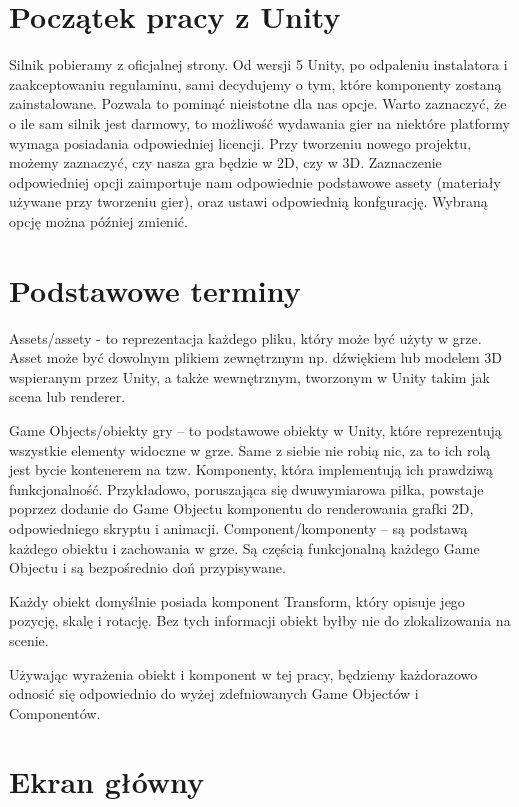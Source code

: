 \documentclass[openright]{xmgr}
\begin{document}
\section{Początek pracy z Unity}

Silnik pobieramy z oficjalnej strony. Od wersji 5 Unity, po odpaleniu instalatora i zaakceptowaniu regulaminu, sami decydujemy o tym, które komponenty zostaną zainstalowane. Pozwala to pominąć nieistotne dla nas opcje. Warto zaznaczyć, że o ile sam silnik jest darmowy, to możliwość wydawania gier na niektóre platformy wymaga posiadania odpowiedniej licencji. Przy tworzeniu nowego projektu, możemy zaznaczyć, czy nasza gra będzie w 2D, czy w 3D. Zaznaczenie odpowiedniej opcji zaimportuje nam odpowiednie podstawowe assety (materiały używane przy tworzeniu gier), oraz ustawi odpowiednią konfgurację.
Wybraną opcję można później zmienić.

\section{Podstawowe terminy}

\quad Assets/assety - to reprezentacja każdego pliku, który może być użyty w grze. Asset może być dowolnym plikiem zewnętrznym np. dźwiękiem lub modelem 3D wspieranym przez Unity, a także wewnętrznym, tworzonym w Unity takim jak scena lub renderer.

Game Objects/obiekty gry – to podstawowe obiekty w Unity, które reprezentują wszystkie elementy widoczne w grze. Same z siebie nie robią nic, za to ich rolą jest bycie kontenerem na tzw. Komponenty, która implementują ich prawdziwą funkcjonalność. Przykładowo, poruszająca się dwuwymiarowa piłka, powstaje poprzez dodanie do Game Objectu komponentu do renderowania grafki 2D, odpowiedniego skryptu i animacji. 
Component/komponenty – są podstawą każdego obiektu i zachowania w grze. Są częścią funkcjonalną każdego Game Objectu i są bezpośrednio doń przypisywane.

Każdy obiekt domyślnie posiada komponent Transform, który opisuje jego pozycję, skalę i rotację. Bez tych informacji obiekt byłby nie do zlokalizowania na scenie.

Używając wyrażenia obiekt i komponent w tej pracy, będziemy każdorazowo odnosić się odpowiednio do wyżej zdefniowanych Game Objectów i Componentów.

\newpage
\section{Ekran główny}
\end{document}
